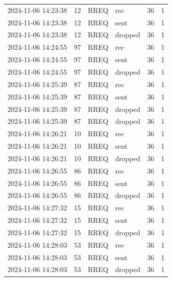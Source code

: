 \documentclass[]{nsm-thesis}
\begin{document}
\begin{longtable}{llllll}
2024-11-06 14:23:38 & 12 & RREQ & rec & 36 & 1 \\
2024-11-06 14:23:38 & 12 & RREQ & sent & 36 & 1 \\
2024-11-06 14:23:38 & 12 & RREQ & dropped & 36 & 1 \\
2024-11-06 14:24:55 & 97 & RREQ & rec & 36 & 1 \\
2024-11-06 14:24:55 & 97 & RREQ & sent & 36 & 1 \\
2024-11-06 14:24:55 & 97 & RREQ & dropped & 36 & 1 \\
2024-11-06 14:25:39 & 87 & RREQ & rec & 36 & 1 \\
2024-11-06 14:25:39 & 87 & RREQ & sent & 36 & 1 \\
2024-11-06 14:25:39 & 87 & RREQ & dropped & 36 & 1 \\
2024-11-06 14:25:39 & 87 & RREQ & dropped & 36 & 1 \\
2024-11-06 14:26:21 & 10 & RREQ & rec & 36 & 1 \\
2024-11-06 14:26:21 & 10 & RREQ & sent & 36 & 1 \\
2024-11-06 14:26:21 & 10 & RREQ & dropped & 36 & 1 \\
2024-11-06 14:26:55 & 86 & RREQ & rec & 36 & 1 \\
2024-11-06 14:26:55 & 86 & RREQ & sent & 36 & 1 \\
2024-11-06 14:26:55 & 86 & RREQ & dropped & 36 & 1 \\
2024-11-06 14:27:32 & 15 & RREQ & rec & 36 & 1 \\
2024-11-06 14:27:32 & 15 & RREQ & sent & 36 & 1 \\
2024-11-06 14:27:32 & 15 & RREQ & dropped & 36 & 1 \\
2024-11-06 14:28:03 & 53 & RREQ & rec & 36 & 1 \\
2024-11-06 14:28:03 & 53 & RREQ & sent & 36 & 1 \\
2024-11-06 14:28:03 & 53 & RREQ & dropped & 36 & 1 \\
\bottomrule
\end{longtable}
\end{document}
